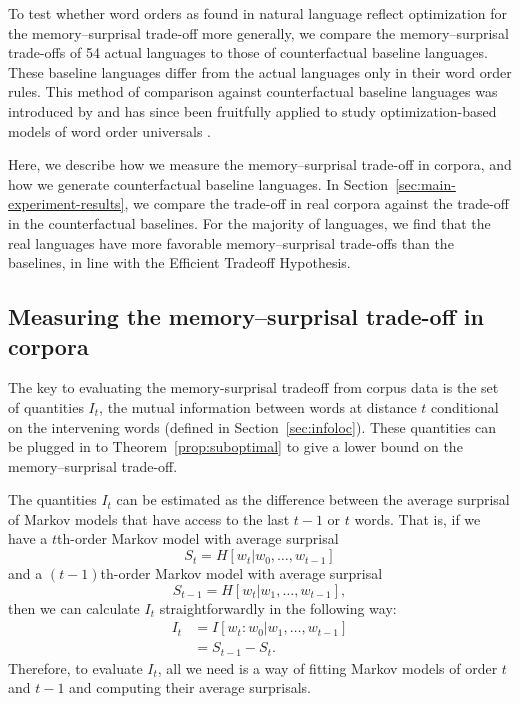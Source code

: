 To test whether word orders as found in natural language reflect optimization for the memory--surprisal trade-off more generally, we compare the memory--surprisal trade-offs of 54 actual languages to those of counterfactual baseline languages. These baseline languages differ from the actual languages only in their word order rules. This method of comparison against counterfactual baseline languages was introduced by \citet{gildea-optimizing-2007,gildea-grammars-2010} and has since been fruitfully applied to study optimization-based models of word order universals  \citep{futrell-large-scale-2015,gildea-human-2015,hahn2020universals}.

Here, we describe how we measure the memory--surprisal trade-off in corpora, and how we generate counterfactual baseline languages. In Section~\ref{sec:main-experiment-results}, we compare the trade-off in real corpora against the trade-off in the counterfactual baselines. For the majority of languages, we find that the real languages have more favorable memory--surprisal trade-offs than the baselines, in line with the Efficient Tradeoff Hypothesis.

\subsection{Measuring the memory--surprisal trade-off in corpora}

The key to evaluating the memory-surprisal tradeoff from corpus data is the set of quantities $I_t$, the  mutual information between words at distance $t$ conditional on the intervening words (defined in Section~\ref{sec:infoloc}). 
These quantities can be plugged in to Theorem~\ref{prop:suboptimal} to give a lower bound on the memory--surprisal trade-off.

The quantities $I_t$ can be estimated as the difference between the average surprisal of Markov models that have access to the last $t-1$ or $t$ words.
That is, if we have a $t$th-order Markov model with average surprisal
\begin{equation*}
    S_t = H[w_t | w_0, \dots, w_{t-1}]
\end{equation*}
and a $(t-1)$th-order Markov model with average surprisal
\begin{equation*}
    S_{t-1} = H[w_t | w_1, \dots, w_{t-1}],
\end{equation*}
then we can calculate $I_t$ straightforwardly in the following way:
\begin{align}
    \nonumber
    I_t &= I[w_t : w_0 | w_1, \dots, w_{t-1}] \\
    \nonumber
    &= S_{t-1} - S_t.
\end{align}
Therefore, to evaluate $I_t$, all we need is a way of fitting Markov models of order $t$ and $t-1$ and computing their average surprisals.

